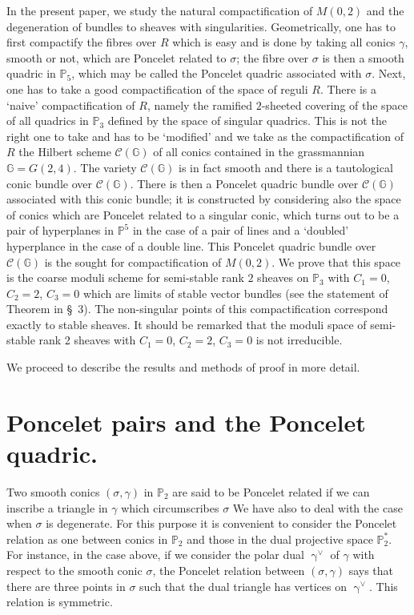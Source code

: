 In the present paper, we study the natural compactification of
$M(0,2)$ and the degeneration of bundles to sheaves with
singularities. Geometrically, one has to first compactify the fibres
over $R$ which is easy and is done by taking all conics $\gamma$,
smooth or not, which are Poncelet related to $\sigma$; the fibre over
$\sigma$ is then a smooth quadric in $\mathbb{P}_5$, which may be
called the Poncelet\pageoriginale
 quadric associated with $\sigma$. Next, one has to
take a good compactification of the space of reguli $R$. There is a
`naive' compactification of $R$, namely the ramified $2$-sheeted
covering of the space of all quadrics in $\mathbb{P}_3$ defined by the
space of singular quadrics. This is not the right one to take and has
to be `modified' and we take as the compactification of $R$ the
Hilbert scheme $\mathscr{C}(\mathbb{G})$ of all conics contained in
the grassmannian $\mathbb{G}=G(2,4)$. The variety $\mathscr{C}(\mathbb{G})$ is in fact smooth and there
is a tautological conic bundle over $\mathscr{C}(\mathbb{G})$. There
is then a Poncelet quadric bundle over $\mathscr{C}(\mathbb{G})$
associated with this conic bundle; it is constructed by considering
also the space of conics which are Poncelet related to a singular
conic, which turns out to be a pair of hyperplanes in $\mathbb{P}^{5}$
in the case of a pair of lines and a `doubled' hyperplance in the case
of a double line. This Poncelet quadric bundle over
$\mathscr{C}(\mathbb{G})$ is the sought for compactification of
$M(0,2)$. We prove that this space is the coarse moduli scheme for
semi-stable rank $2$ sheaves on $\mathbb{P}_3$ with $C_1=0$, $C_2=2$,
$C_3=0$ which are limits of stable vector bundles (see the statement
of Theorem in \S\ 3). The non-singular points of this compactification
correspond exactly to stable sheaves. It should be remarked that the
moduli space of semi-stable rank 2 sheaves with $C_1=0$, $C_2=2$,
$C_3=0$ is not irreducible. 

We proceed to describe the results and methods of proof in more
detail. 

\section{Poncelet pairs and the Poncelet quadric.}\label{s2}

 Two smooth conics $(\sigma, \gamma)$ in $\mathbb{P}_2$ are said to be
 Poncelet  related\pageoriginale
 if we can inscribe a triangle in $\gamma$ which
 circumscribes $\sigma$ We have also to deal with the case when
 $\sigma$ is degenerate. For this purpose it is convenient to consider
 the Poncelet relation as one between conics in $\mathbb{P}_2$ and
 those in the dual projective space $\mathbb{P}^{\ast}_{2}$. For
 instance, in the case above, if we consider the polar dual
 $\displaystyle\mathop{\gamma}^{\vee}$  of $\gamma$ with respect to
 the smooth conic $\sigma$, the Poncelet relation between $(\sigma,
 \gamma)$ says that there are three points in $\sigma$ such that the
 dual triangle has vertices on
 $\displaystyle\mathop{\gamma}^{\vee}$. This relation is symmetric. 

